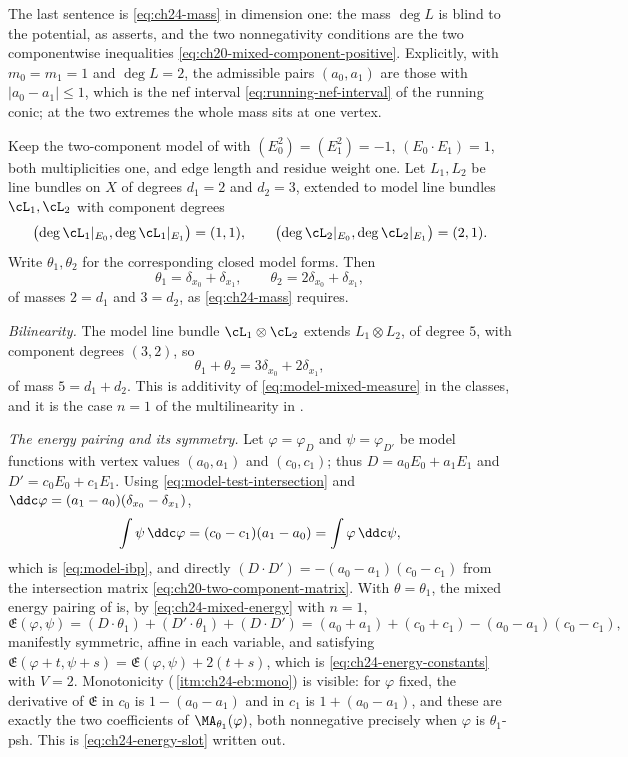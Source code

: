 The last sentence is \eqref{eq:ch24-mass} in dimension one: the mass
\(\deg L\) is blind to the potential, as
 asserts, and the two nonnegativity
conditions are the two componentwise inequalities
\eqref{eq:ch20-mixed-component-positive}.  Explicitly, with
\(m_0=m_1=1\) and \(\deg L=2\), the admissible pairs \((a_0,a_1)\) are those
with \(|a_0-a_1|\leq1\), which is the nef interval
\eqref{eq:running-nef-interval} of the running conic; at the two extremes the
whole mass sits at one vertex.

\begin{example}
\label{ex:ch24-curve-mixed}
Keep the two-component model of  with
\((E_0^2)=(E_1^2)=-1\), \((E_0\cdot E_1)=1\), both multiplicities one, and
edge length and residue weight one.  Let \(L_1,L_2\) be line bundles on \(X\) of degrees
\(d_1=2\) and \(d_2=3\), extended to model line bundles
\(\cL_1,\cL_2\) with component degrees
\[
 \bigl(\deg\cL_1|_{E_0},\deg\cL_1|_{E_1}\bigr)=(1,1),
 \qquad
 \bigl(\deg\cL_2|_{E_0},\deg\cL_2|_{E_1}\bigr)=(2,1).
\]
Write \(\theta_1,\theta_2\) for the corresponding closed model forms.  Then
\[
 \theta_1=\delta_{x_0}+\delta_{x_1},
 \qquad
 \theta_2=2\delta_{x_0}+\delta_{x_1},
\]
of masses \(2=d_1\) and \(3=d_2\), as \eqref{eq:ch24-mass} requires.

\emph{Bilinearity.}  The model line bundle \(\cL_1\otimes\cL_2\) extends
\(L_1\otimes L_2\), of degree \(5\), with component degrees \((3,2)\), so
\[
 \theta_1+\theta_2=3\delta_{x_0}+2\delta_{x_1},
\]
of mass \(5=d_1+d_2\).  This is additivity of
\eqref{eq:model-mixed-measure} in the classes, and it is the case \(n=1\) of
the multilinearity in .

\emph{The energy pairing and its symmetry.}  Let \(\varphi=\varphi_D\) and
\(\psi=\varphi_{D'}\) be model functions with vertex values \((a_0,a_1)\) and
\((c_0,c_1)\); thus \(D=a_0E_0+a_1E_1\) and \(D'=c_0E_0+c_1E_1\).  Using
\eqref{eq:model-test-intersection} and
\(\ddc\varphi=(a_1-a_0)(\delta_{x_0}-\delta_{x_1})\),
\[
 \int\psi\,\ddc\varphi
 =(c_0-c_1)(a_1-a_0)
 =\int\varphi\,\ddc\psi ,
\]
which is \eqref{eq:model-ibp}, and directly
\((D\cdot D')=-(a_0-a_1)(c_0-c_1)\) from the intersection matrix
\eqref{eq:ch20-two-component-matrix}.  With \(\theta=\theta_1\), the mixed
energy pairing of  is, by
\eqref{eq:ch24-mixed-energy} with \(n=1\),
\[
 \mathfrak E(\varphi,\psi)
 =(D\cdot\theta_1)+(D'\cdot\theta_1)+(D\cdot D')
 =(a_0+a_1)+(c_0+c_1)-(a_0-a_1)(c_0-c_1),
\]
manifestly symmetric, affine in each variable, and satisfying
\(\mathfrak E(\varphi+t,\psi+s)=\mathfrak E(\varphi,\psi)+2(t+s)\), which is
\eqref{eq:ch24-energy-constants} with \(V=2\).  Monotonicity
(\,\cref{itm:ch24-eb:mono}) is visible: for
\(\varphi\) fixed, the derivative of \(\mathfrak E\) in \(c_0\) is
\(1-(a_0-a_1)\) and in \(c_1\) is \(1+(a_0-a_1)\), and these are exactly the
two coefficients of \(\MA_{\theta_1}(\varphi)\), both nonnegative precisely
when \(\varphi\) is \(\theta_1\)-psh.  This is
\eqref{eq:ch24-energy-slot} written out.


\end{example}

